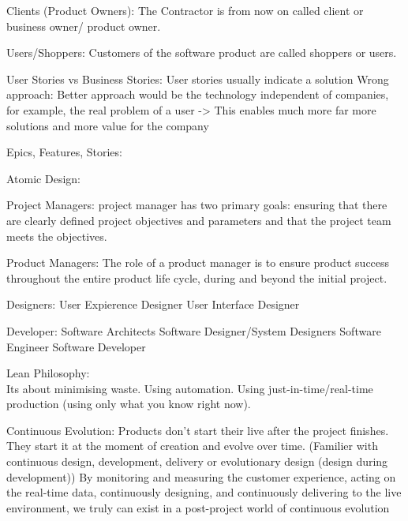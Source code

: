 Clients (Product Owners):
The Contractor is from now on called client or business owner/ product owner.

Users/Shoppers:
Customers of the software product are called shoppers or users.

User Stories vs Business Stories:
User stories usually indicate a solution
Wrong approach:
Better approach would be the technology independent of companies, for example, the real problem of a user -> This enables much more far more solutions and more value for the company

Epics, Features, Stories:

Atomic Design:

Project Managers:
project manager has two primary goals: ensuring that there are clearly defined project objectives and parameters and that the project team meets the objectives.

Product Managers:
The role of a product manager is to ensure product success throughout the entire product life cycle, during and beyond the initial project.

Designers:
User Expierence Designer
User Interface Designer

Developer:
Software Architects
Software Designer/System Designers
Software Engineer
Software Developer

Lean Philosophy:\\
Its about minimising waste. Using automation. Using just-in-time/real-time production (using only what you know right now).

Continuous Evolution: 
Products don't start their live after the project finishes.\\
They start it at the moment of creation and evolve over time.
(Familier with continuous design, development, delivery or evolutionary design (design during development))
By monitoring and measuring the customer experience, acting on the real-time data, continuously designing, and continuously delivering to the live environment, we truly can exist in a post-project world of continuous evolution